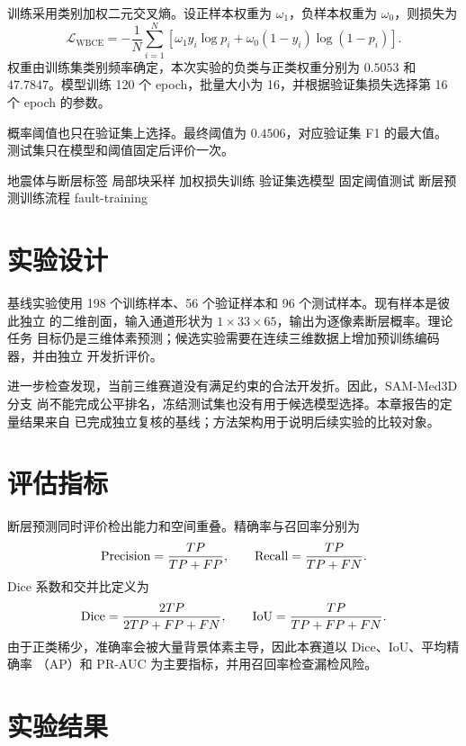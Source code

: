 训练采用类别加权二元交叉熵。设正样本权重为 $\omega_1$，负样本权重为
$\omega_0$，则损失为
\begin{equation}
  \mathcal{L}_{\mathrm{WBCE}}
  =-\frac{1}{N}\sum_{i=1}^{N}
  \left[\omega_1 y_i\log p_i+\omega_0(1-y_i)\log(1-p_i)\right].
\end{equation}
权重由训练集类别频率确定，本次实验的负类与正类权重分别为 $0.5053$ 和
$47.7847$。模型训练 120 个 epoch，批量大小为 16，并根据验证集损失选择第 16
个 epoch 的参数。

概率阈值也只在验证集上选择。最终阈值为 $0.4506$，对应验证集 F1 的最大值。
测试集只在模型和阈值固定后评价一次。

\TrainingFlow
  {地震体与断层标签}
  {局部块采样}
  {加权损失训练}
  {验证集选模型}
  {固定阈值测试}
  {断层预测训练流程}
  {fault-training}

\section{实验设计}

基线实验使用 198 个训练样本、56 个验证样本和 96 个测试样本。现有样本是彼此独立
的二维剖面，输入通道形状为 $1\times33\times65$，输出为逐像素断层概率。理论任务
目标仍是三维体素预测；候选实验需要在连续三维数据上增加预训练编码器，并由独立
开发折评价。

进一步检查发现，当前三维赛道没有满足约束的合法开发折。因此，SAM-Med3D 分支
尚不能完成公平排名，冻结测试集也没有用于候选模型选择。本章报告的定量结果来自
已完成独立复核的基线；方法架构用于说明后续实验的比较对象。

\section{评估指标}

断层预测同时评价检出能力和空间重叠。精确率与召回率分别为
\begin{equation}
  \mathrm{Precision}=\frac{TP}{TP+FP},
  \qquad
  \mathrm{Recall}=\frac{TP}{TP+FN}.
\end{equation}
Dice 系数和交并比定义为
\begin{equation}
  \mathrm{Dice}=\frac{2TP}{2TP+FP+FN},
  \qquad
  \mathrm{IoU}=\frac{TP}{TP+FP+FN}.
\end{equation}
由于正类稀少，准确率会被大量背景体素主导，因此本赛道以 Dice、IoU、平均精确率
（AP）和 PR-AUC 为主要指标，并用召回率检查漏检风险。

\section{实验结果}

